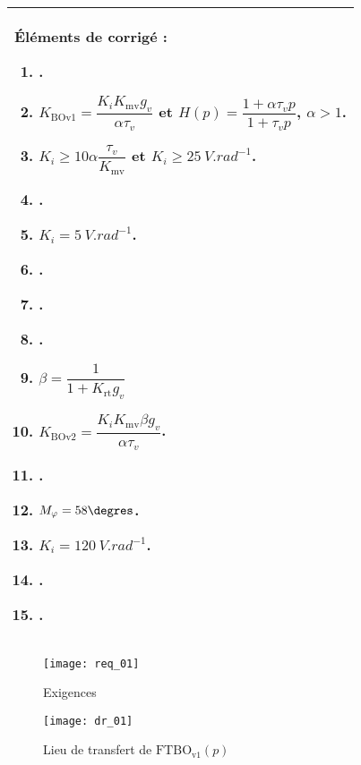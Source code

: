 \begin{multicols}{2}
\ifprof
\begin{corrige}
\end{corrige}
\else
\fi

\footnotesize
\noindent\begin{tabular}{|p{.95\linewidth}|}
\hline
Éléments de corrigé :
\begin{enumerate}
\item .
\item $K_{\text{BOv1}}=\dfrac{K_iK_{\text{mv}}g_v}{\alpha \tau_v}$ et $H(p)=\dfrac{1+\alpha \tau_v p}{1+ \tau_v p}$, $\alpha>1$.
\item $K_i \geq 10\alpha \dfrac{\tau_v}{K_{\text{mv}}}$ et $K_i\geq \SI{25}{V.rad^{-1}}$.
\item .
\item $K_i = \SI{5}{V.rad^{-1}}$.
\item .
\item .
\item .
\item $\beta = \dfrac{1}{1+K_{\text{rt}}g_v}$
\item $K_{\text{BOv2}}=\dfrac{K_i K_{\text{mv}}\beta g_v}{\alpha \tau_v}$. %
\item .
\item $M_{\varphi}=58\degres$.
\item $K_i = \SI{120}{V.rad^{-1}}$. %
\item .
\item .
\end{enumerate}\\
\hline
\end{tabular}
\normalsize

\ifprof
\else
\end{multicols}
\fi


\begin{figure}[H]
\centering

\texttt{[image: req\_01]}

\caption{Exigences \label{ann_01}}
\end{figure}

\begin{figure}[H]
\centering
\texttt{[image: dr\_01]}

\caption{Lieu de transfert de $\text{FTBO}_{\text{v1}}(p)$ \label{dr_01}}
\end{figure}

